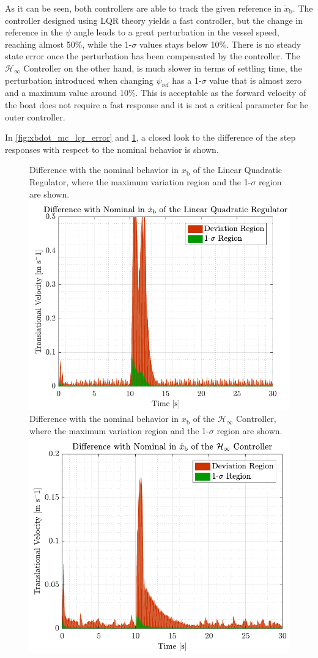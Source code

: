 As it can be seen, both controllers are able to track the given reference in $\dot{x}_\mathrm{b}$. The controller designed using LQR theory yields a fast controller, but the change in reference in the $\psi$ angle leads to a great perturbation in the vessel speed, reaching almost 50\%, while the 1-$\sigma$ values stays below 10\%. There is no steady state error once the perturbation has been compensated by the controller. The $\mathcal{H}_\infty$ Controller on the other hand, is much slower in terms of settling time, the perturbation introduced when changing $\psi_\mathrm{ref}$ has a 1-$\sigma$ value that is almost zero and a maximum value around 10\%. This is acceptable as the forward velocity of the boat does not require a fast response and it is not a critical parameter for he outer controller.

In \autoref{fig:xbdot_mc_lqr_error} and \ref{fig:xbdot_mc_rob_error}, a closed look to the difference of the step responses with respect to the nominal behavior is shown.
\begin{figure}[H]
    \captionbox 
    {   
        Difference with the nominal behavior in $x_\mathrm{b}$ of the Linear Quadratic Regulator, where the maximum variation region and the 1-$\sigma$ region are shown.
        \label{fig:xbdot_mc_lqr_error}
    }                                                                 
    {                                                                  
        \includegraphics[width=.45\textwidth]{figures/xbdot_mc_lqr_error}         
    }                                                                    
    \hspace{5pt}                                                          
    \captionbox  
    {      
         Difference with the nominal behavior in $x_\mathrm{b}$ of the $\mathcal{H}_\infty$ Controller, where the maximum variation region and the 1-$\sigma$ region are shown.
        \label{fig:xbdot_mc_rob_error}
    }                                                                          
    {
        \includegraphics[width=.45\textwidth]{figures/xbdot_mc_rob_error}
    }
\end{figure}

